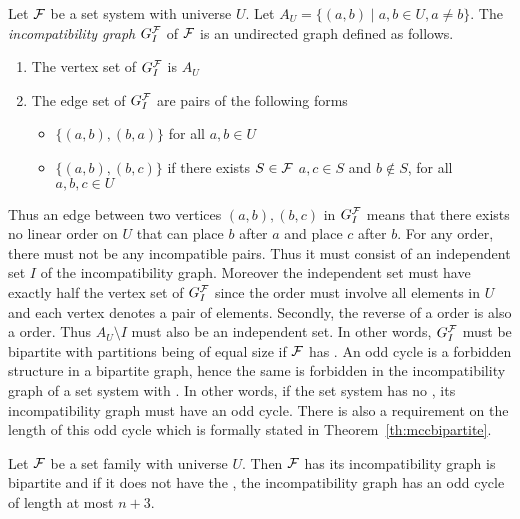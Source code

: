 \begin{definition}
  \label{def:incompatibility}
  Let ${\cal F}$ be a set system with universe $U$. Let $A_U = \{(a,b)
  \mid a, b \in U, a \ne b\}$. The {\em incompatibility graph}
  $G_I^{\cal F}$ of ${\cal F}$ is an undirected graph defined as follows.
  \begin{enumerate}
  \item   The vertex set of $G_I^{\cal F}$ is $A_U$
  \item  The edge set of $G_I^{\cal F}$ are pairs of the following forms
    \begin{itemize}
    \item $\{(a,b),(b,a)\}$ for all $a, b \in U$
    \item $\{(a,b),(b,c)\}$ if there exists $S \in {\cal F}$ \stt $a, c
      \in S$ and $b \notin S$, for all $a, b, c \in U$
    \end{itemize}
  \end{enumerate}
  \dstop
\end{definition}

Thus an edge between two vertices $(a,b), (b,c)$ in $G_I^{{\cal F}}$ means
that there exists no linear order on $U$ that can place $b$ after $a$
and place $c$ after $b$.  For any \COP order, there must not be any
incompatible pairs. Thus it must consist of an independent set $I$ of
the incompatibility graph. Moreover the independent set must have
exactly half the vertex set of $G_I^{\cal F}$ since the \COP order must
involve all elements in $U$ and each vertex denotes a pair of elements. Secondly, the reverse of a \COP order is
also a \COP order. Thus $A_U \setminus I$ must also be an
independent set. In other words, $G_I^{\cal F}$ must be bipartite with
partitions being of equal size if ${\cal F}$ has \COP. An odd cycle is a
forbidden structure in a bipartite graph, hence the same is forbidden
in the incompatibility graph of a set system with \COP. In other
words, if the set system has no \COP, its incompatibility graph must
have an odd cycle.  There is also a requirement on the length of this
odd cycle which is formally stated in Theorem~\ref{th:mccbipartite}.

\begin{theoremsansproof} 
  \label{th:mccbipartite}
  Let ${\cal F}$ be a set family with universe $U$. Then ${\cal F}$ has \COP
  \iff its incompatibility graph is bipartite and if it does not have
  the \COP, the incompatibility graph has an odd cycle of length at
  most $n+3$.
\end{theoremsansproof}

